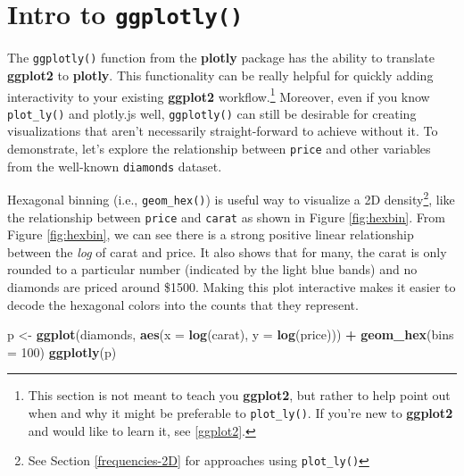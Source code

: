 \documentclass[
  12pt,
]{krantz}
\newenvironment{Shaded}{\begin{snugshade}}{\end{snugshade}}
\newcommand{\DataTypeTok}[1]{\textcolor[rgb]{0.13,0.29,0.53}{#1}}
\newcommand{\DecValTok}[1]{\textcolor[rgb]{0.00,0.00,0.81}{#1}}
\newcommand{\KeywordTok}[1]{\textcolor[rgb]{0.13,0.29,0.53}{\textbf{#1}}}
\newcommand{\NormalTok}[1]{#1}
\newcommand{\OperatorTok}[1]{\textcolor[rgb]{0.81,0.36,0.00}{\textbf{#1}}}
\newcommand{\StringTok}[1]{\textcolor[rgb]{0.31,0.60,0.02}{#1}}
\begin{document}
\hypertarget{intro-ggplotly}{%
\section{\texorpdfstring{Intro to \texttt{ggplotly()}}{Intro to ggplotly()}}\label{intro-ggplotly}}


The \texttt{ggplotly()} function from the \textbf{plotly} package has the ability to translate \textbf{ggplot2} to \textbf{plotly}. This functionality can be really helpful for quickly adding interactivity to your existing \textbf{ggplot2} workflow.\footnote{This section is not meant to teach you \textbf{ggplot2}, but rather to help point out when and why it might be preferable to \texttt{plot\_ly()}. If you're new to \textbf{ggplot2} and would like to learn it, see \ref{ggplot2}.} Moreover, even if you know \texttt{plot\_ly()} and plotly.js well, \texttt{ggplotly()} can still be desirable for creating visualizations that aren't necessarily straight-forward to achieve without it. To demonstrate, let's explore the relationship between \texttt{price} and other variables from the well-known \texttt{diamonds} dataset.

Hexagonal binning (i.e., \texttt{geom\_hex()}) is useful way to visualize a 2D density\footnote{See Section \ref{frequencies-2D} for approaches using \texttt{plot\_ly()}}, like the relationship between \texttt{price} and \texttt{carat} as shown in Figure \ref{fig:hexbin}. From Figure \ref{fig:hexbin}, we can see there is a strong positive linear relationship between the \emph{log} of carat and price. It also shows that for many, the carat is only rounded to a particular number (indicated by the light blue bands) and no diamonds are priced around \$1500. Making this plot interactive makes it easier to decode the hexagonal colors into the counts that they represent.


\begin{Shaded}
\begin{Highlighting}[]
\NormalTok{p <-}\StringTok{ }\KeywordTok{ggplot}\NormalTok{(diamonds, }\KeywordTok{aes}\NormalTok{(}\DataTypeTok{x =} \KeywordTok{log}\NormalTok{(carat), }\DataTypeTok{y =} \KeywordTok{log}\NormalTok{(price))) }\OperatorTok{+}\StringTok{ }
\StringTok{  }\KeywordTok{geom_hex}\NormalTok{(}\DataTypeTok{bins =} \DecValTok{100}\NormalTok{)}
\KeywordTok{ggplotly}\NormalTok{(p)}
\end{Highlighting}
\end{Shaded}
\end{document}
